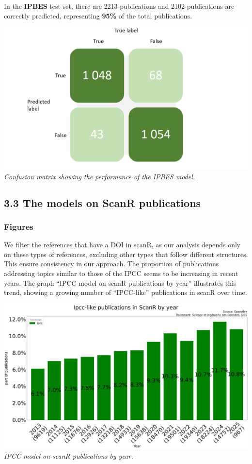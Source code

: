 \documentclass[
]{article}
\begin{document}
In the \textbf{IPBES} test set, there are 2213 publications and 2102
publications are correctly predicted, representing \textbf{95\%} of the
total publications.

\includegraphics{./images/teds_ipbes_model.png} \emph{Confusion matrix
showing the performance of the IPBES model.}

\hypertarget{the-models-on-scanr-publications}{%
\subsection{3.3 The models on ScanR
publications}\label{the-models-on-scanr-publications}}

\hypertarget{figures}{%
\subsubsection{Figures}\label{figures}}

We filter the references that have a DOI in scanR, as our analysis
depends only on these types of references, excluding other types that
follow different structures. This ensure consistency in our approach.
The proportion of publications addressing topics similar to those of the
IPCC seems to be increasing in recent years. The graph ``IPCC model on
scanR publications by year'' illustrates this trend, showing a growing
number of ``IPCC-like'' publications in scanR over time.

\includegraphics{./images/teds_model_scanR1.png} \emph{IPCC model on
scanR publications by year.}
\end{document}
